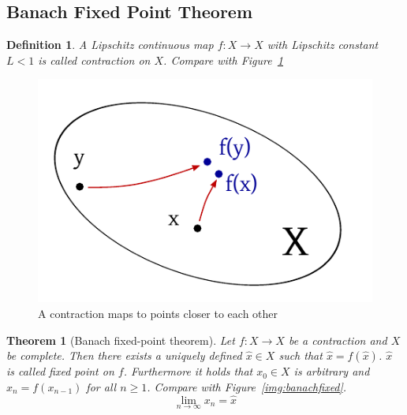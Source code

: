 \documentclass{article}
\newtheorem{theorem}{Theorem}  \numberwithin{theorem}{section}
\newtheorem{definition}{Definition}  \numberwithin{definition}{section}
\begin{document}
\subsection{Banach Fixed Point Theorem}
\begin{definition} %
  A Lipschitz continuous map $f: X \to X$ with Lipschitz constant $L < 1$ is called \emph{contraction on $X$}. Compare with Figure~\ref{img:contraction}
\end{definition}

\begin{figure}[t]
  \begin{center}
    \includegraphics{img/07_contraction.pdf}
    \caption{A contraction maps to points closer to each other}
    \label{img:contraction}
  \end{center}
\end{figure}

\begin{theorem}[Banach fixed-point theorem] %
  Let $f: X \to X$ be a contraction and $X$ be complete.
  Then there exists a uniquely defined $\hat{x} \in X$ such that $\hat{x} = f(\hat{x})$. $\hat{x}$ is called fixed point on $f$.
  Furthermore it holds that $x_0 \in X$ is arbitrary and $x_n = f(x_{n-1})$ for all $n \geq 1$. Compare with Figure~\ref{img:banachfixed}.
  \[ \lim_{n \to \infty} x_n = \hat{x} \]
\end{theorem}
\end{document}
